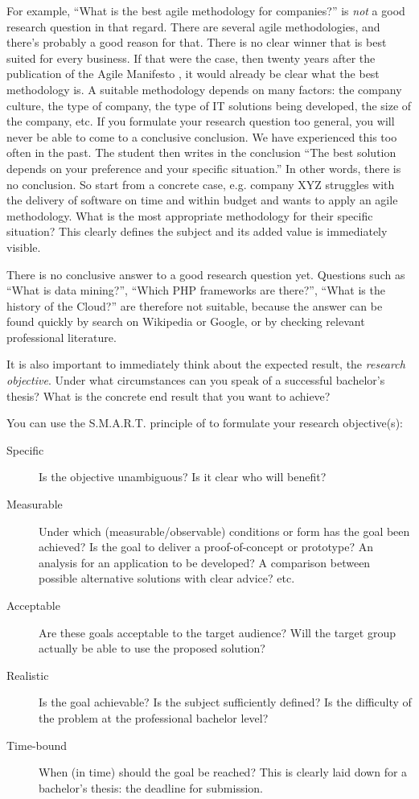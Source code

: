 For example, ``What is the best agile methodology for companies?'' is \textit{not} a good research question in that regard. There are several agile methodologies, and there's probably a good reason for that. There is no clear winner that is best suited for every business. If that were the case, then twenty years after the publication of the Agile Manifesto \autocite{BeckEtAl2001}, it would already be clear what the best methodology is. A suitable methodology depends on many factors: the company culture, the type of company, the type of IT solutions being developed, the size of the company, etc. If you formulate your research question too general, you will never be able to come to a conclusive conclusion. We have experienced this too often in the past. The student then writes in the conclusion ``The best solution depends on your preference and your specific situation.'' In other words, there is no conclusion. So start from a concrete case, e.g. company XYZ struggles with the delivery of software on time and within budget and wants to apply an agile methodology. What is the most appropriate methodology for their specific situation? This clearly defines the subject and its added value is immediately visible.

There is no conclusive answer to a good research question yet. Questions such as ``What is data mining?'', ``Which PHP frameworks are there?'', ``What is the history of the Cloud?'' are therefore not suitable, because the answer can be found quickly by search on Wikipedia or Google, or by checking relevant professional literature.

It is also important to immediately think about the expected result, the \textit{research objective}. Under what circumstances can you speak of a successful bachelor's thesis? What is the concrete end result that you want to achieve?

You can use the S.M.A.R.T. principle of \autocite{UchelenJungjohann2003} to formulate your research objective(s):

\begin{description}
    \item[Specific] Is the objective unambiguous? Is it clear who will benefit?
    \item[Measurable] Under which (measurable/observable) conditions or form has the goal been achieved? Is the goal to deliver a proof-of-concept or prototype? An analysis for an application to be developed? A comparison between possible alternative solutions with clear advice? etc.
    \item[Acceptable] Are these goals acceptable to the target audience? Will the target group actually be able to use the proposed solution?
    \item[Realistic] Is the goal achievable? Is the subject sufficiently defined? Is the difficulty of the problem at the professional bachelor level?
    \item[Time-bound] When (in time) should the goal be reached? This is clearly laid down for a bachelor's thesis: the deadline for submission. 
\end{description}

